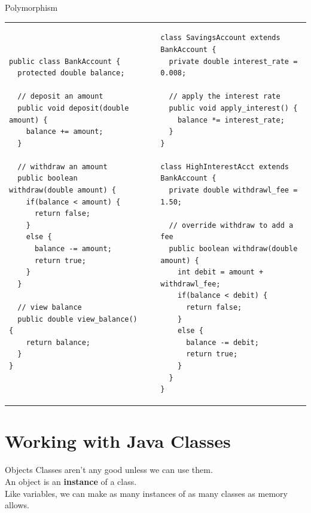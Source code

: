 \documentclass{beamer}
\makeatletter
\newenvironment{splitslide}
{
\centering
\begin{tabular}{@{}p{0.50\textwidth} | p{0.025\textwidth}@{} p{0.4\textwidth}@{}}
}
{
\end{tabular}
}
\makeatother
\begin{document}
\begin{frame}[fragile]{Polymorphism}
\begin{splitslide}

\begin{Verbatim}[fontsize=\tiny]
public class BankAccount {
  protected double balance;
  
  // deposit an amount
  public void deposit(double amount) {
    balance += amount;
  }
  
  // withdraw an amount
  public boolean withdraw(double amount) {
    if(balance < amount) {
      return false;
    }
    else {
      balance -= amount;
      return true;
    }
  }
  
  // view balance
  public double view_balance() {
    return balance;  
  }
}
\end{Verbatim}

&&

\begin{Verbatim}[fontsize=\tiny]
class SavingsAccount extends BankAccount {
  private double interest_rate = 0.008;
  
  // apply the interest rate
  public void apply_interest() {
    balance *= interest_rate;
  }
}

class HighInterestAcct extends BankAccount {
  private double withdrawl_fee = 1.50;
  
  // override withdraw to add a fee
  public boolean withdraw(double amount) {
    int debit = amount + withdrawl_fee;    
    if(balance < debit) {
      return false;
    }
    else {
      balance -= debit;
      return true;
    }
  }
}
\end{Verbatim}

\end{splitslide}
\end{frame}


\section{Working with Java Classes}


\begin{frame}[fragile]{Objects}
Classes aren't any good unless we can use them. \\
\vspace{0.5em}
An object is an \textbf{instance} of a class.   \\
\vspace{0.5em}
Like variables, we can make as many instances of as many classes as memory allows. \\
	
\end{frame}
\end{document}
